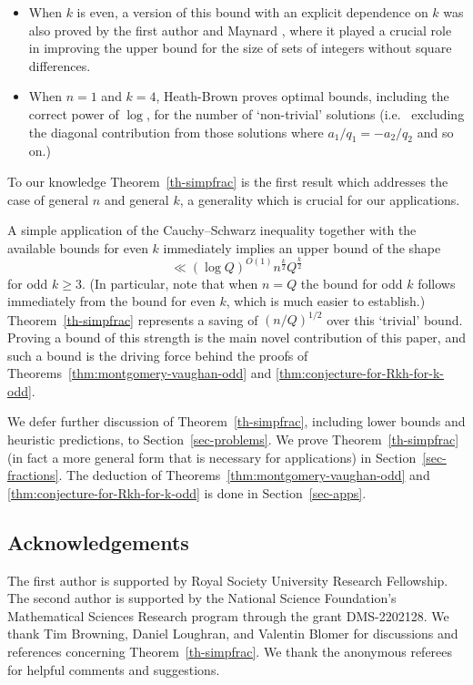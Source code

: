 \documentclass[11pt,letterpaper]{amsart}
\theoremstyle{definition}
\begin{document}
\begin{itemize}
    \item When $k$ is even, a version of this bound with an explicit dependence on $k$ was also proved by the first author and Maynard \cite[Theorem 2]{BM22}, where it played a crucial role in improving the upper bound for the size of sets of integers without square differences.
    \item When $n = 1$ and $k = 4$, Heath-Brown \cite{H-B} proves optimal bounds, including the correct power of $\log$, for the number of `non-trivial' solutions (i.e.~ excluding the diagonal contribution from those solutions where $a_1/q_1=-a_2/q_2$ and so on.) 
\end{itemize}

To our knowledge Theorem~\ref{th-simpfrac} is the first result which addresses the case of general $n$ and general $k$, a generality which is crucial for our applications. 

A simple application of the Cauchy--Schwarz inequality together with the available bounds for even $k$ immediately implies an upper bound of the shape
\[\ll (\log Q)^{O(1)}n^{\frac{k}{2}}Q^{\frac{k}{2}}\]
for odd $k\geq 3$. (In particular, note that when $n=Q$ the bound for odd $k$ follows immediately from the bound for even $k$, which is much easier to establish.) Theorem~\ref{th-simpfrac} represents a saving of $(n/Q)^{1/2}$ over this `trivial' bound. Proving a bound of this strength is the main novel contribution of this paper, and such a bound is the driving force behind the proofs of Theorems~\ref{thm:montgomery-vaughan-odd} and \ref{thm:conjecture-for-Rkh-for-k-odd}.

We defer further discussion of Theorem~\ref{th-simpfrac}, including lower bounds and heuristic predictions, to Section~\ref{sec-problems}. We prove Theorem~\ref{th-simpfrac} (in fact a more general form that is necessary for applications) in Section~\ref{sec-fractions}. The deduction of Theorems~\ref{thm:montgomery-vaughan-odd} and \ref{thm:conjecture-for-Rkh-for-k-odd} is done in Section~\ref{sec-apps}.

\subsection*{Acknowledgements}
The first author is supported by Royal Society University Research Fellowship. The second author is supported by the National Science Foundation's Mathematical Sciences Research program through the grant DMS-2202128. We thank Tim Browning, Daniel Loughran, and Valentin Blomer for discussions and references concerning Theorem~\ref{th-simpfrac}. We thank the anonymous referees for helpful comments and suggestions.
\end{document}
